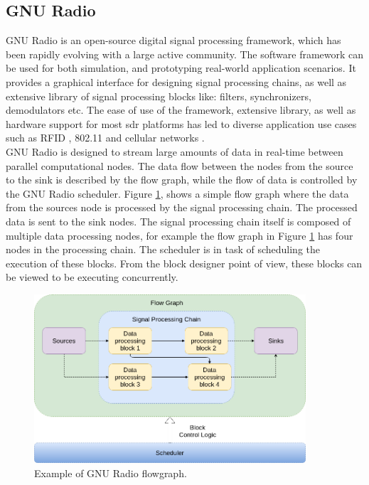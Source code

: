 \subsection{GNU Radio}

GNU Radio is an open-source digital signal processing framework, which has been rapidly evolving with a large active community.
The software framework can be used for both simulation, and prototyping real-world application scenarios. 
It  provides a graphical interface for designing signal processing chains,  as well as extensive library of signal processing blocks like: filters, synchronizers, demodulators etc.
The ease of use of the framework, extensive library, as well as hardware support for most \ac{sdr} platforms has led to diverse application use cases such as RFID \cite{buettner_software_2011}, 802.11 \cite{bloessl_towards_2013} and cellular networks \cite{demel_lte_2015}.\\


GNU Radio is designed to stream large amounts of data in real-time between parallel computational nodes.
The data flow between the nodes from the source to the sink is described by the flow graph, while the flow of data is controlled by the GNU Radio scheduler.
Figure \ref{gnuradio_arch}, shows a simple flow graph where the data from the sources node is processed by the signal processing chain.
The processed data is sent to the sink nodes.
The signal processing chain itself is composed of multiple data processing nodes, for example the flow graph in Figure \ref{gnuradio_arch} has four nodes in the processing chain.
The scheduler is in task of scheduling the execution of these blocks. 
From the block designer point of view, these blocks can be viewed to be executing concurrently.

\begin{figure}[h!]
\centering
\includegraphics[width=0.9\textwidth]{Figure/GNURADIO_1.png}
\caption{Example of GNU Radio flowgraph.}
\label{gnuradio_arch}
\end{figure}

